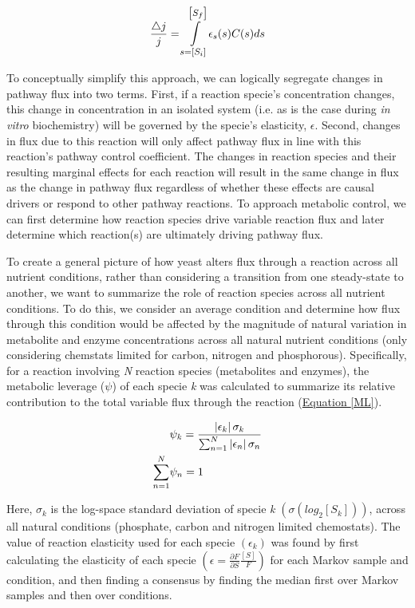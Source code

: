\begin{equation}
\frac{\bigtriangleup j}{j} = \mathlarger{\int\limits_{s = \left[S_{i}\right]}^{\left[S_{f}\right]}}\epsilon_{s}(s)C(s)ds
\label{KBequation}
\end{equation}

To conceptually simplify this approach, we can logically segregate changes in pathway flux into two terms. First, if a reaction specie's concentration changes, this change in concentration in an isolated system (i.e. as is the case during \textit{in vitro} biochemistry) will be governed by the specie's elasticity, $\epsilon$. Second, changes in flux due to this reaction will only affect pathway flux in line with this reaction's pathway control coefficient.  The changes in reaction species and their resulting marginal effects for each reaction will result in the same change in flux as the change in pathway flux regardless of whether these effects are causal drivers or respond to other pathway reactions. To approach metabolic control, we can first determine how reaction species drive variable reaction flux and later determine which reaction(s) are ultimately driving pathway flux.

To create a general picture of how yeast alters flux through a reaction across all nutrient conditions, rather than considering a transition from one steady-state to another, we want to summarize the role of reaction species across all nutrient conditions.  To do this, we consider an average condition and determine how flux through this condition would be affected by the magnitude of natural variation in metabolite and enzyme concentrations across all natural nutrient conditions (only considering chemstats limited for carbon, nitrogen and phosphorous).  Specifically, for a reaction involving \textit{N} reaction species (metabolites and enzymes), the metabolic leverage ($\psi$) of each specie \textit{k} was calculated to summarize its relative contribution to the total variable flux through the reaction (\hyperref[ML]{Equation \ref{ML}}).

\begin{align}
&\psi_{k} = \frac{\left|\epsilon_{k}\right|\sigma_{k}}{\sum_{n = 1}^{N}\left|\epsilon_{n}\right|\sigma_{n}}\label{ML}\\
\sum_{n = 1}^{N} &\psi_{n} = 1\notag
\end{align}

Here, $\sigma_{k}$ is the log-space standard deviation of specie \textit{k} $\left(\sigma\left(log_{2}\left[S_{k}\right]\right)\right)$, across all natural conditions (phosphate, carbon and nitrogen limited chemostats).  The value of reaction elasticity used for each specie $\left(\epsilon_{k}\right)$ was found by first calculating the elasticity of each specie $\left(\epsilon = \frac{\partial F}{\partial S}\frac{[S]}{F}\right)$ for each Markov sample and condition, and then finding a consensus by finding the median first over Markov samples and then over conditions. 

